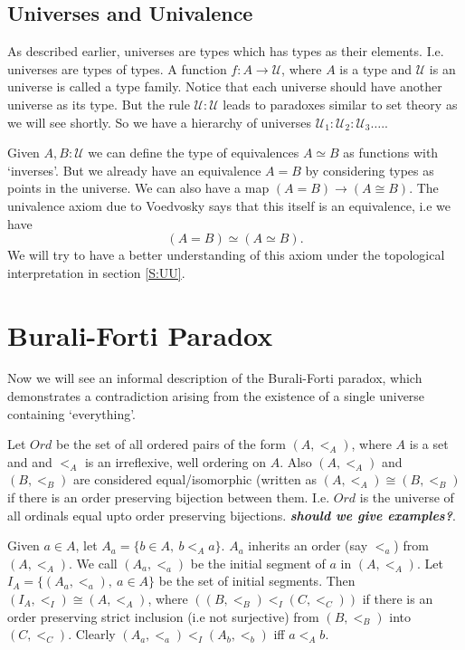 \documentclass[10pt]{article}
\theoremstyle{definition}
\theoremstyle{plain}
\theoremstyle{remark}
\newcommand{\U}{\mathscr{U}}
\begin{document}
\subsection{Universes and Univalence}

As described earlier, universes are types which has types as their elements. I.e. universes
are types of types. A function $f : A \to \U$, where $A$ is a type and $\U$ is an universe
is called a type family. Notice that each universe should have another universe as its type.
But the rule $\U : \U$ leads to paradoxes similar to set theory as we will see shortly. 
So we have a hierarchy of universes $\U_1 : \U_2 : \U_3 \dots $.\smallskip.

Given $A, B:\U$ we can define the type of equivalences $A\simeq B$ as functions
with `inverses'. But we already have an equivalence $A = B$ by considering types as points
in the universe. We can also have a map $(A = B) \to (A \cong B)$. The univalence axiom 
due to Voedvosky says that this itself is an equivalence, i.e we have
\[ (A = B) \simeq (A \simeq B).\]
We will try to have a better understanding of this axiom under the topological interpretation
in section \ref{S:UU}.

\section{Burali-Forti Paradox}\label{S:BFP}

Now we will see an informal description of the Burali-Forti paradox, which demonstrates a
contradiction arising from the existence of a single universe containing `everything'.\smallskip

Let $Ord$ be the set of all ordered pairs of the form $(A, <_A)$, where $A$ is a set and
and $<_A$ is an irreflexive, well ordering on $A$. Also $(A, <_A)$ and $(B, <_B)$ are 
considered equal/isomorphic (written as $(A,<_A) \cong (B,<_B)$ if there is an order 
preserving bijection between them. I.e. $Ord$ is the universe of all ordinals equal upto 
order preserving bijections. \textbf{\textit{should we give examples?}}.\smallskip

Given $a\in A$, let $A_a = \{b \in A,\ b <_A a \}$. $A_a$ inherits an order (say $<_a$)
from $(A, <_A)$. We call $(A_a, <_a)$ be the initial segment of $a$ in $(A, <_A)$. Let
$I_A = \{(A_a, <_a),\ a\in A\}$ be the set of initial segments. Then 
$(I_A,<_I) \cong (A, <_A)$, where $((B,<_B) <_I (C,<_C))$ if there is an order preserving 
strict inclusion (i.e not surjective) from $(B,<_B)$ into $(C,<_C)$. Clearly 
$(A_a,<_a) <_I (A_b,<_b)$ iff $a <_A b$.\smallskip
\end{document}
